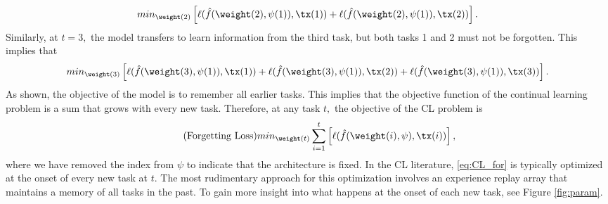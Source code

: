 \begin{align}
    min_{\weight(2)} \left[ \ell(\hat{f}(\weight(2), \psi(1)), \tx(1)) + \ell(\hat{f}(\weight(2), \psi(1)), \tx(2)) \right].
\end{align}
Similarly, at $t=3,$ the model transfers to learn information from the third task, but both tasks 1 and 2 must not be forgotten. This implies that 
\begin{align}
    min_{\weight(3)} \left[ \ell(\hat{f}(\weight(3), \psi(1)), \tx(1)) + \ell(\hat{f}(\weight(3), \psi(1)), \tx(2)) + \ell(\hat{f}(\weight(3), \psi(1)), \tx(3))\right] .
\end{align}
As shown, the objective of the model is to remember all earlier tasks. This implies that the objective function of the continual learning problem is a sum that grows with every new task. Therefore, at any task $t,$ the objective of the CL problem is 
\begin{align}~\label{eq:CL_for}\tag{Forgetting Loss}
    min_{\weight(t)} \sum_{i=1}^t \left[\ell(\hat{f}(\weight(i), \psi), \tx(i)) \right], 
\end{align}
where we have removed the index from $\psi$ to indicate that the architecture is fixed. In the CL literature, \eqref{eq:CL_for} is typically optimized at the onset of every new task at $t.$ The most rudimentary approach for this optimization  involves an experience replay array that maintains a memory of all tasks in the past. To gain more insight into what happens at the onset of each new task, see Figure \ref{fig:param}.

